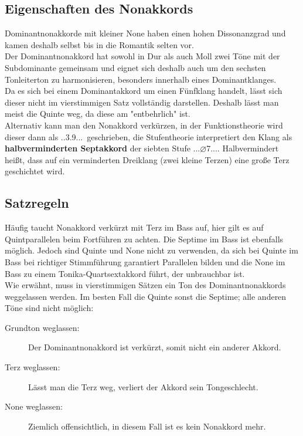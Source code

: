 \documentclass[a4paper]{article}
\newcommand{\mShoch}[4]{\HH.\romannumeral #1..#2.#3.#4.} %
\newcommand{\Dhochv}[2]{\HH.\Ohne{D}.#2.#1...} %
\begin{document}
	\subsection{Eigenschaften des Nonakkords}
	Dominantnonakkorde mit kleiner None haben einen hohen Dissonanzgrad und kamen deshalb selbst bis in die Romantik selten vor.\\
	Der Dominantnonakkord hat sowohl in Dur als auch Moll zwei Töne mit der Subdominante gemeinsam und eignet sich deshalb auch um den sechsten Tonleiterton zu harmonisieren, besonders innerhalb eines Dominantklanges.\\
	Da es sich bei einem Dominantakkord um einen Fünfklang handelt, lässt sich dieser nicht im vierstimmigen Satz vollständig darstellen. Deshalb lässt man meist die Quinte weg, da diese am "{}entbehrlich"{} ist.\\
	Alternativ kann man den Nonakkord verkürzen, in der Funktionstheorie wird dieser dann als \Dhochv{9}{3}\ geschrieben, die Stufentheorie interpretiert den Klang als \textbf{halbverminderten Septakkord} der siebten Stufe \mShoch{7}{$\varnothing$7}{}{}. Halbvermindert heißt, dass auf ein verminderten Dreiklang (zwei kleine Terzen) eine große Terz geschichtet wird.
	
	\subsection{Satzregeln}
	Häufig taucht Nonakkord verkürzt mit Terz im Bass auf, hier gilt es auf Quintparallelen beim Fortführen zu achten. Die Septime im Bass ist ebenfalls möglich. Jedoch sind Quinte und None nicht zu verwenden, da sich bei Quinte im Bass bei richtiger Stimmführung garantiert Parallelen bilden und die None im Bass zu einem Tonika-Quartsextakkord führt, der unbrauchbar ist.\\
	Wie erwähnt, muss in vierstimmigen Sätzen ein Ton des Dominantnonakkords weggelassen werden. Im besten Fall die Quinte sonst die Septime; alle anderen Töne sind nicht möglich:
	\begin{description}
		\item[Grundton weglassen:] Der Dominantnonakkord ist verkürzt, somit nicht ein anderer Akkord.
		\item[Terz weglassen:] Lässt man die Terz weg, verliert der Akkord sein Tongeschlecht.
		\item[None weglassen:] Ziemlich offensichtlich, in diesem Fall ist es kein Nonakkord mehr.
	\end{description}
	
\end{document}
